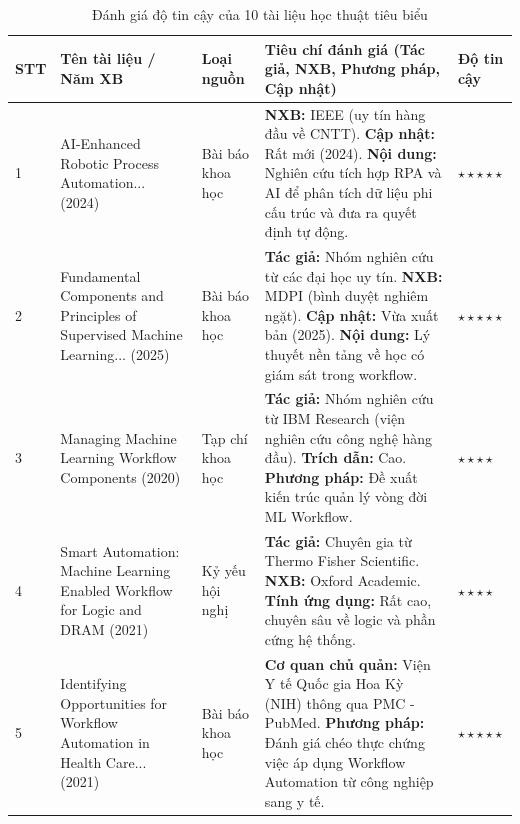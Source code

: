\documentclass[12pt,a4paper]{article}
\begin{document}
\begin{table}[H]
    \centering
    \caption{Đánh giá độ tin cậy của 10 tài liệu học thuật tiêu biểu}
    \vspace{0.2cm}
    \small
    \begin{tabular}{|p{0.5cm}|p{3.8cm}|p{2.0cm}|p{8.2cm}|p{1.5cm}|}
        \hline
        \textbf{STT} & \textbf{Tên tài liệu / Năm XB} & \textbf{Loại nguồn} & \textbf{Tiêu chí đánh giá (Tác giả, NXB, Phương pháp, Cập nhật)} & \textbf{Độ tin cậy} \\
        \hline
        1 & AI-Enhanced Robotic Process Automation... (2024) & Bài báo khoa học & \textbf{NXB:} IEEE (uy tín hàng đầu về CNTT). \newline \textbf{Cập nhật:} Rất mới (2024). \newline \textbf{Nội dung:} Nghiên cứu tích hợp RPA và AI để phân tích dữ liệu phi cấu trúc và đưa ra quyết định tự động. & $\star\star\star\star\star$ \\
        \hline
        2 & Fundamental Components and Principles of Supervised Machine Learning... (2025) & Bài báo khoa học & \textbf{Tác giả:} Nhóm nghiên cứu từ các đại học uy tín. \newline \textbf{NXB:} MDPI (bình duyệt nghiêm ngặt). \newline \textbf{Cập nhật:} Vừa xuất bản (2025). \newline \textbf{Nội dung:} Lý thuyết nền tảng về học có giám sát trong workflow. & $\star\star\star\star\star$ \\
        \hline
        3 & Managing Machine Learning Workflow Components (2020) & Tạp chí khoa học & \textbf{Tác giả:} Nhóm nghiên cứu từ IBM Research (viện nghiên cứu công nghệ hàng đầu). \newline \textbf{Trích dẫn:} Cao. \newline \textbf{Phương pháp:} Đề xuất kiến trúc quản lý vòng đời ML Workflow. & $\star\star\star\star$ \\
        \hline
        4 & Smart Automation: Machine Learning Enabled Workflow for Logic and DRAM (2021) & Kỷ yếu hội nghị & \textbf{Tác giả:} Chuyên gia từ Thermo Fisher Scientific. \newline \textbf{NXB:} Oxford Academic. \newline \textbf{Tính ứng dụng:} Rất cao, chuyên sâu về logic và phần cứng hệ thống. & $\star\star\star\star$ \\
        \hline
        5 & Identifying Opportunities for Workflow Automation in Health Care... (2021) & Bài báo khoa học & \textbf{Cơ quan chủ quản:} Viện Y tế Quốc gia Hoa Kỳ (NIH) thông qua PMC - PubMed. \newline \textbf{Phương pháp:} Đánh giá chéo thực chứng việc áp dụng Workflow Automation từ công nghiệp sang y tế. & $\star\star\star\star\star$ \\
        \hline
    \end{tabular}
    \label{tab:evaluation_part1}
\end{table}
\end{document}
